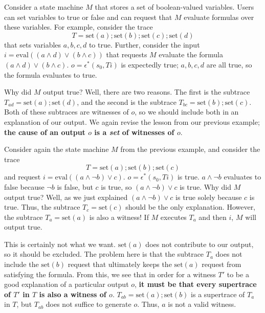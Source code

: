 \begin{example}
  \newcommand{\Mset}{\text{set}}
  \newcommand{\Meval}{\text{eval}}
  Consider a state machine $M$ that stores a set of boolean-valued variables.
  Users can set variables to true or false and can request that $M$ evaluate
  formulas over these variables. For example, consider the trace
  \[
    T = \Mset(a); \Mset(b); \Mset(c); \Mset(d)
  \]
  that sets variables $a, b, c, d$ to true. Further, consider the input $i =
  \Meval((a \land d) \lor (b \land c))$ that requests $M$ evaluate the formula
  $(a \land d) \lor (b \land c)$. $o = \epsilon^*(s_0, Ti)$ is expectedly true;
  $a, b, c, d$ are all true, so the formula evaluates to true.

  Why did $M$ output true? Well, there are two reasons. The first is the
  subtrace $T_{ad} = \Mset(a); \Mset(d)$, and the second is the subtrace
  $T_{bc} = \Mset(b); \Mset(c)$. Both of these subtraces are witnesses of $o$,
  so we should include both in an explanation of our output. We again revise
  the lesson from our previous example; \textbf{the cause of an output $o$ is a
  \emph{set} of witnesses of $o$}.
\end{example}

\begin{example}
  \newcommand{\Mset}{\text{set}}
  \newcommand{\Meval}{\text{eval}}
  Consider again the state machine $M$ from the previous example, and consider
  the trace
  \[
    T = \Mset(a); \Mset(b); \Mset(c)
  \]
  and request $i = \Meval((a \land \lnot b) \lor c)$. $o = \epsilon^*(s_0, Ti)$
  is true. $a \land \lnot b$ evaluates to false because $\lnot b$ is false, but
  $c$ is true, so $(a \land \lnot b) \lor c$ is true.
  Why did $M$ output true? Well, as we just explained $(a \land \lnot b) \lor
  c$ is true solely because $c$ is true. Thus, the subtrace $T_c = \Mset(c)$
  should be the only explanation. However, the subtrace $T_a = \Mset(a)$ is
  also a witness! If $M$ executes $T_a$ and then $i$, $M$ will output true.

  This is certainly not what we want. $\Mset(a)$ does not contribute to our
  output, so it should be excluded. The problem here is that the subtrace $T_a$
  does not include the $\Mset(b)$ request that ultimately keeps the $\Mset(a)$
  request from satisfying the formula. From this, we see that in order for a
  witness $T'$ to be a good explanation of a particular output $o$, \textbf{it
    must be that every supertrace of $T'$ in $T$ is also a witness of $o$}.
    $T_{ab} = \Mset(a); \Mset(b)$ is a supertrace of $T_a$ in $T$, but $T_{ab}$
    does not suffice to generate $o$. Thus, $a$ is not a valid witness.
\end{example}

